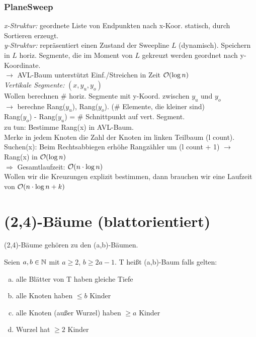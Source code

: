             \subsubsection{PlaneSweep}
                \emph{x-Struktur:} geordnete Liste von Endpunkten nach x-Koor. statisch, durch Sortieren erzeugt.\\
                \emph{y-Struktur:} repräsentiert einen Zustand der Sweepline $L$ (dynamisch). Speichern in $L$ horiz. Segmente, 
                die im Moment von $L$ gekreuzt werden geordnet nach y-Koordinate.\\
                $\rightarrow$ AVL-Baum unterstützt Einf./Streichen in Zeit $\mathcal{O}(\log n)$\\
                
                \emph{Vertikale Segmente:} $(x, y_{u}, y_{o})$\\
                Wollen berechnen \# horiz. Segmente mit y-Koord. zwischen $y_{u}$ und $y_{o}$\\
                $\rightarrow$ berechne Rang($y_{u}$), Rang($y_{o}$). (\# Elemente, die kleiner sind)\\
                Rang($y_{o}$) - Rang($y_{u}$) = \# Schnittpunkt auf vert. Segment.\\
                zu tun: Bestimme Rang(x) in AVL-Baum.\\

                Merke in jedem Knoten die Zahl der Knoten im linken Teilbaum (l count).\\
                Suchen(x): Beim Rechtsabbiegen erhöhe Rangzähler um (l count + 1) $\rightarrow$ Rang(x) in $\mathcal{O}(\log n)$\\
                $\Rightarrow$ Gesamtlaufzeit: $\mathcal{O}(n \cdot \log n)$ \\
                Wollen wir die Kreuzungen explizit bestimmen, dann brauchen wir eine Laufzeit von $\mathcal{O}(n \cdot \log n + k)$

    \section{(2,4)-Bäume (blattorientiert)}
        (2,4)-Bäume gehören zu den (a,b)-Bäumen.
        
        \begin{definition}
            Seien $a,b \in \mathbb{N}$ mit $a \geq 2$, $b \geq 2a-1$. T heißt (a,b)-Baum falls gelten:
            \begin{enumerate}[a)]
                \item alle Blätter von T haben gleiche Tiefe
                \item alle Knoten haben $\leq b$ Kinder
                \item alle Knoten (außer Wurzel) haben $\geq a$ Kinder
                \item Wurzel hat $\geq 2$ Kinder
            \end{enumerate}
        \end{definition}
        
